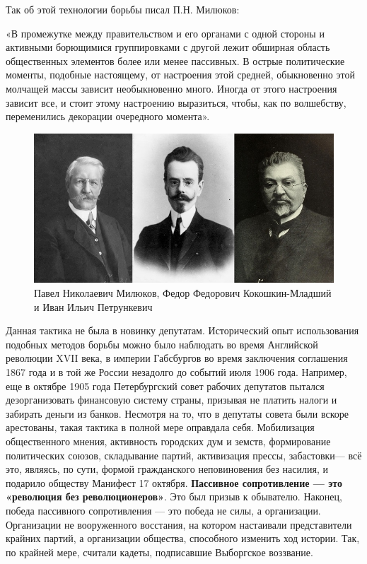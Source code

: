 Так об этой технологии борьбы писал П.Н. Милюков:
\begin{textcitation}
«В промежутке между правительством и его органами с одной стороны и активными борющимися группировками с другой лежит обширная область общественных элементов более или менее пассивных. В острые политические моменты, подобные настоящему, от настроения этой средней, обыкновенно этой молчащей массы зависит необыкновенно много. Иногда от этого настроения зависит все, и стоит этому настроению выразиться, чтобы, как по волшебству, переменились декорации очередного момента».
\end{textcitation}
\begin{figure}[h!tb] 
	\centering\includegraphics[scale=0.5]{Vozzvanie/jX4A4UFCctY.jpg}
	\caption{Павел Николаевич Милюков, Федор Федорович Кокошкин-Младший и Иван Ильич Петрункевич
	}%
\end{figure}

Данная тактика не была в новинку депутатам. Исторический опыт использования подобных методов борьбы можно было наблюдать во время Английской революции XVII века, в империи Габсбургов во время заключения соглашения 1867 года и в той же России незадолго до событий июля 1906 года.
Например, еще в октябре 1905 года Петербургский совет рабочих депутатов пытался дезорганизовать финансовую систему страны, призывая не платить налоги и забирать деньги из банков. Несмотря на то, что в депутаты совета были вскоре арестованы, такая тактика в полной мере оправдала себя. Мобилизация общественного мнения, активность городских дум и земств, формирование политических союзов, складывание партий, активизация прессы, забастовки— всё это, являясь, по сути, формой гражданского неповиновения без насилия, и подарило обществу Манифест 17 октября.
\textbf{Пассивное сопротивление — это «революция без революционеров»}. Это был призыв к обывателю. Наконец, победа пассивного сопротивления — это победа не силы, а организации. Организации не вооруженного восстания, на котором настаивали представители крайних партий, а организации общества, способного изменить ход истории. Так, по крайней мере, считали кадеты, подписавшие Выборгское воззвание.

